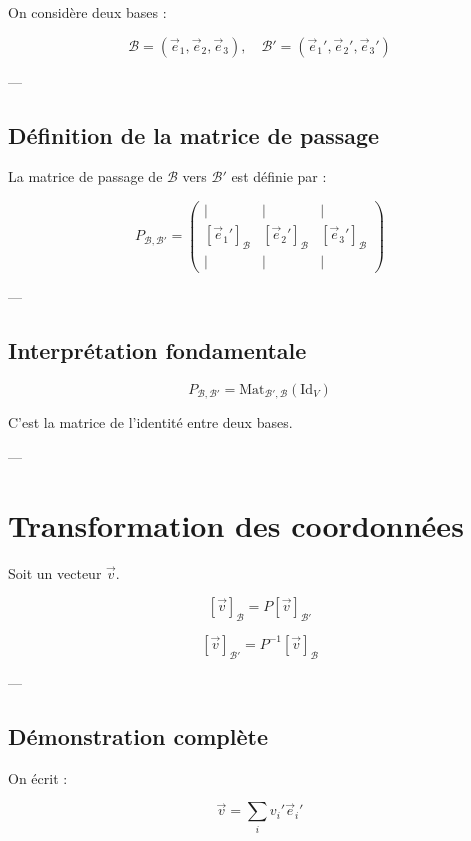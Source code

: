 \documentclass[11pt,a4paper]{article}
\begin{document}
On considère deux bases :

\[
\mathcal{B} = (\vec{e}_1,\vec{e}_2,\vec{e}_3), \quad
\mathcal{B}' = (\vec{e}_1',\vec{e}_2',\vec{e}_3')
\]

---

\subsection{Définition de la matrice de passage}

La matrice de passage de $\mathcal{B}$ vers $\mathcal{B}'$ est définie par :

\[
P_{\mathcal{B},\mathcal{B}'}
=
\begin{pmatrix}
| & | & | \\
[\vec{e}_1']_{\mathcal{B}} &
[\vec{e}_2']_{\mathcal{B}} &
[\vec{e}_3']_{\mathcal{B}} \\
| & | & |
\end{pmatrix}
\]

---

\subsection{Interprétation fondamentale}

\[
P_{\mathcal{B},\mathcal{B}'} = \text{Mat}_{\mathcal{B}',\mathcal{B}}(\mathrm{Id}_V)
\]

 C’est la matrice de l’identité entre deux bases.

---

\section{Transformation des coordonnées}

Soit un vecteur $\vec{v}$.

\[
[\vec{v}]_{\mathcal{B}} = P [\vec{v}]_{\mathcal{B}'}
\]

\[
[\vec{v}]_{\mathcal{B}'} = P^{-1} [\vec{v}]_{\mathcal{B}}
\]

---

\subsection{Démonstration complète}

On écrit :

\[
\vec{v} = \sum_i v_i' \vec{e}_i'
\]
\end{document}
